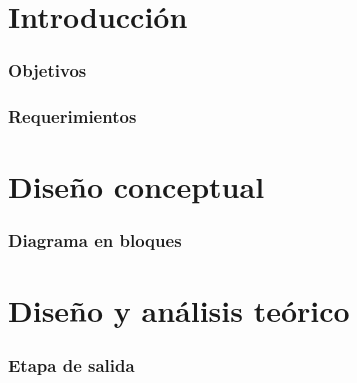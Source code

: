 \documentclass[10pt,a4paper]{article}
\begin{document}
		
	\setcounter{page}{1}

	\part{Introducción}\label{part:intro}

		\section{Objetivos}\label{sec:obj}
			

		\section{Requerimientos}\label{sec:req}
			

	\part{Diseño conceptual}\label{part:concept}

%			

		\section{Diagrama en bloques}\label{sec:bloques}
			
%
%			

	\part{Diseño y análisis teórico}\label{part:teo}

		\section{Etapa de salida}
			
\end{document}
